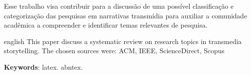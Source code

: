 \documentclass[
article,			%
11pt,				%
oneside,			%
a4paper,			%
english,			%
brazil,				%
sumario=tradicional
]{abntex2}
\begin{document}
  Esse trabalho visa contribuir para a discussão de uma possível classificação e categorização das pesquisas em narrativas transmídia para auxiliar a comunidade acadêmica a compreender e identificar temas relevantes de pesquisa.


  \postextual


  \emptythanks
  \maketitle

  \renewcommand{\resumoname}{Abstract}
  \begin{resumoumacoluna}
    \begin{otherlanguage*}{english}
      This paper discuss a systematic review on research topics in transmedia storytelling. The chosen sources were: ACM, IEEE, ScienceDirect, Scopus

      \vspace{\onelineskip}

      \noindent
      \textbf{Keywords}: latex. abntex.
    \end{otherlanguage*}
  \end{resumoumacoluna}

\end{document}

